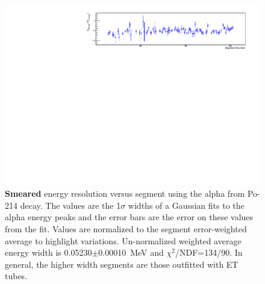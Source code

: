 \begin{figure}[!h]
\centering
\includegraphics[width=1.05\textwidth]{figures/PubBiPo214EsmearresvsCell.pdf}
\caption{\label{fig:EsmearresvsCell214}{\bf Smeared} energy resolution versus segment using the alpha from Po-214 decay. The values are the 1$\sigma$ widths of a Gaussian fits to the alpha energy peaks and the error bars are the error on these values from the fit. Values are normalized to the segment error-weighted average to highlight variations. Un-normalized weighted average energy width is 0.05230$\pm$0.00010~MeV and $\chi^2$/NDF=134/90.  In general, the higher width segments are those outfitted with ET tubes.}
\end{figure}
\clearpage
\newpage
